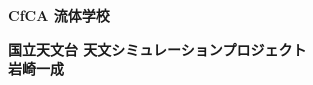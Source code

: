 
\setcounter{page}{1}

\thispagestyle{empty}


\vspace{20cm}
\begin{center}

  {\Huge \bf CfCA 流体学校} 
  

\vfill
\vfill
\vfill
\vfill
\vfill
\vfill
   {\Large \bf 国立天文台 天文シミュレーションプロジェクト} \\
   \vspace{1cm}
   {\Large \bf 岩崎一成} \\
  \vfill
\end{center}


  







